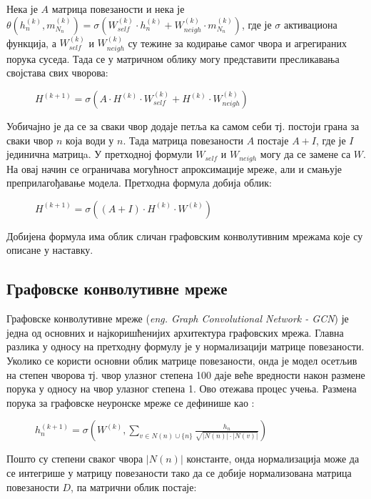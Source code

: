 \documentclass[11pt,oneside]{memoir}
\begin{document}
Нека је $A$ матрица повезаности и нека је $\theta (h^{(k)}_n, m^{(k)}_{N_{n}}) = \sigma (W^{(k)}_{self}\cdot h^{(k)}_n + W^{(k)}_{neigh}\cdot m^{(k)}_{N_{n}})$,
где је $\sigma$ активациона функција, а $W^{(k)}_{self}$ и $W^{(k)}_{neigh}$ су тежине за кодирање самог чвора и агрегираних порука суседа. Тада се у матричном облику
могу представити пресликавања својстава свих чворова:

\begin{figure}[H]
  \centering
  $H^{(k+1)} = \sigma (A\cdot H^{(k)}\cdot W^{(k)}_{self} + H^{(k)}\cdot W^{(k)}_{neigh})$
\end{figure}

Уобичајно је да се за сваки чвор додаје петља ка самом себи тј. постоји грана за сваки чвор $n$ која води у $n$. Тада матрица повезаности $A$
постаје $A+I$, где је $I$ јединична матрицa. У претходној формули $W_{self}$ и $W_{neigh}$ могу да се замене са $W$. На овај начин се 
ограничава могућност апроксимације мреже, али и смањује преприлагођавање модела. Претходна формула добија облик:

\begin{figure}[H]
  \centering
  $H^{(k+1)} = \sigma ((A+I)\cdot H^{(k)}\cdot W^{(k)})$
\end{figure}

Добијена формула има облик сличан графовским конволутивним мрежама које су описане у наставку.

\subsection{Графовске конволутивне мреже}

Графовске конволутивне мреже (\textit{eng. Graph Convolutional Network - GCN}) је једна од основних и најкоришћенијих архитектура графовских мрежа.
Главна разлика у односу на претходну формулу је у нормализацији матрице повезаности. Уколико се користи основни облик матрице повезаности,
онда је модел осетљив на степен чворова тј. чвор улазног степена 100 даје веће вредности након размене порука у односу на чвор улазног степена 1.
Ово отежава процес учења. Размена порука за графовске неуронске мреже се дефинише као \cite{grl}:

\begin{figure}[H]
  \centering
  $h^{(k+1)}_n = \sigma (W^{(k)}, \sum_{v \in N(n) \cup \{n\}} \frac{h_n}{\sqrt{|N(n)|\cdot |N(v)|}})$
\end{figure}

Пошто су степени сваког чвора $|N(n)|$ константе, онда нормализација може да се интегрише у матрицу повезаности тако да се добије
нормализована матрица повезаности $D$, па матрични облик постаје:
\end{document}
